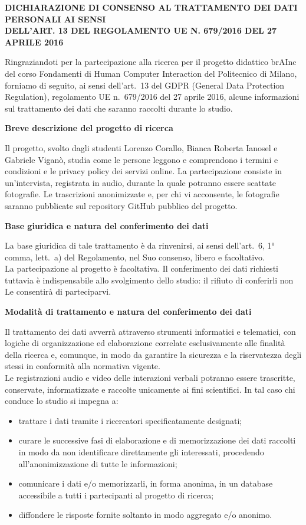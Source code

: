 \documentclass[10pt,a4paper]{article}
\newcommand{\progetto}{brAInc}
\newcommand{\corso}{Fondamenti di Human Computer Interaction}
\newcommand{\sezione}[1]{\par\needspace{4\baselineskip}\textbf{#1}\par}
\begin{document}
\vspace*{1em}
\textbf{DICHIARAZIONE DI CONSENSO AL TRATTAMENTO DEI DATI PERSONALI AI SENSI\\
DELL'ART. 13 DEL REGOLAMENTO UE N. 679/2016 DEL 27 APRILE 2016}

\medskip
{\large Ringraziandoti per la partecipazione alla ricerca per il progetto didattico
\progetto{} del corso \corso{} del Politecnico di Milano, forniamo di seguito, ai sensi
dell'art.~13 del GDPR (General Data Protection Regulation), regolamento UE n.~679/2016 del
27 aprile 2016, alcune informazioni sul trattamento dei dati che saranno raccolti durante lo
studio.\par}

\medskip
\sezione{Breve descrizione del progetto di ricerca}
Il progetto, svolto dagli studenti Lorenzo Corallo, Bianca Roberta Ianosel e Gabriele Viganò,
studia come le persone leggono e comprendono i termini e condizioni e le privacy policy dei
servizi online. La partecipazione consiste in un'intervista,
registrata in audio, durante la quale potranno essere scattate fotografie.
Le trascrizioni anonimizzate e, per chi vi acconsente, le fotografie saranno pubblicate sul
repository GitHub pubblico del progetto.

\bigskip
\sezione{Base giuridica e natura del conferimento dei dati}
La base giuridica di tale trattamento è da rinvenirsi, ai sensi dell'art.~6, 1° comma,
lett.~a) del Regolamento, nel Suo consenso, libero e facoltativo.\\
La partecipazione al progetto è facoltativa. Il conferimento dei dati richiesti tuttavia è
indispensabile allo svolgimento dello studio: il rifiuto di conferirli non Le consentirà di
parteciparvi.
\sezione{Modalità di trattamento e natura del conferimento dei dati}
Il trattamento dei dati avverrà attraverso strumenti informatici e telematici, con logiche di
organizzazione ed elaborazione correlate esclusivamente alle finalità della ricerca e,
comunque, in modo da garantire la sicurezza e la riservatezza degli stessi in conformità alla
normativa vigente.\\
Le registrazioni audio e video delle interazioni verbali potranno essere trascritte,
conservate, informatizzate e raccolte unicamente ai fini scientifici. In tal caso chi conduce
lo studio si impegna a:
\begin{itemize}
  \item trattare i dati tramite i ricercatori specificatamente designati;
  \item curare le successive fasi di elaborazione e di memorizzazione dei dati raccolti in modo
        da non identificare direttamente gli interessati, procedendo all'anonimizzazione di
        tutte le informazioni;
  \item comunicare i dati e/o memorizzarli, in forma anonima, in un database accessibile a
        tutti i partecipanti al progetto di ricerca;
  \item diffondere le risposte fornite soltanto in modo aggregato e/o anonimo.
\end{itemize}
\end{document}
